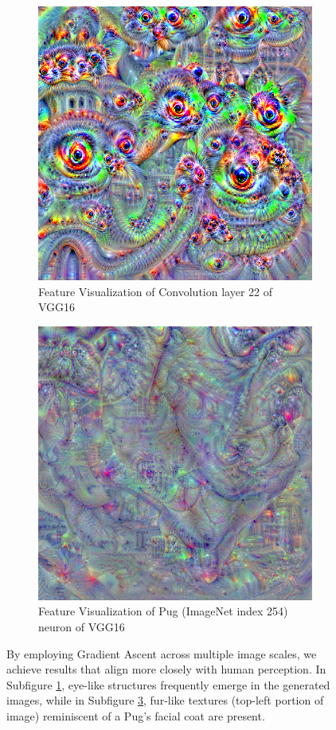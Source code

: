 \begin{figure}
    \captionsetup{justification=centering}

    \begin{subfigure}[t]{0.45\textwidth}
        \captionsetup{justification=centering}
        \centering
        \includegraphics[width=.7\linewidth]{figuras/feat_vis/random_image_dream_pyramid.png}
        \caption{Feature Visualization of Convolution layer 22 of VGG16}
        \label{fig:feat_conv_L22_pyramid}
    \end{subfigure}
    \hfill
    \begin{subfigure}[t]{0.45\textwidth}
        \captionsetup{justification=centering}
        \centering
        \includegraphics[width=.7\linewidth]{figuras/feat_vis/random_image_dream_pyramid_class_254.png}
        \caption{Feature Visualization of Pug (ImageNet index 254) neuron of VGG16}
        \label{fig:feat_conv_I254_pyramid}
    \end{subfigure}

    \caption{By employing Gradient Ascent across multiple image scales, we achieve results that align more closely with human perception. In Subfigure \ref{fig:feat_conv_L22_pyramid}, eye-like structures frequently emerge in the generated images, while in Subfigure \ref{fig:feat_conv_I254_pyramid}, fur-like textures (top-left portion of image) reminiscent of a Pug's facial coat are present.}
\end{figure}

